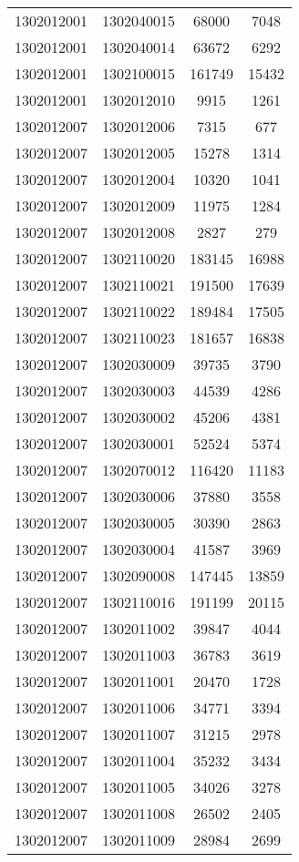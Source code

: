 \begin{longtable}{llcc}
1302012001 & 1302040015 & 68000 & 7048\\
1302012001 & 1302040014 & 63672 & 6292\\
1302012001 & 1302100015 & 161749 & 15432\\
1302012001 & 1302012010 & 9915 & 1261\\
1302012007 & 1302012006 & 7315 & 677\\
1302012007 & 1302012005 & 15278 & 1314\\
1302012007 & 1302012004 & 10320 & 1041\\
1302012007 & 1302012009 & 11975 & 1284\\
1302012007 & 1302012008 & 2827 & 279\\
1302012007 & 1302110020 & 183145 & 16988\\
1302012007 & 1302110021 & 191500 & 17639\\
1302012007 & 1302110022 & 189484 & 17505\\
1302012007 & 1302110023 & 181657 & 16838\\
1302012007 & 1302030009 & 39735 & 3790\\
1302012007 & 1302030003 & 44539 & 4286\\
1302012007 & 1302030002 & 45206 & 4381\\
1302012007 & 1302030001 & 52524 & 5374\\
1302012007 & 1302070012 & 116420 & 11183\\
1302012007 & 1302030006 & 37880 & 3558\\
1302012007 & 1302030005 & 30390 & 2863\\
1302012007 & 1302030004 & 41587 & 3969\\
1302012007 & 1302090008 & 147445 & 13859\\
1302012007 & 1302110016 & 191199 & 20115\\
1302012007 & 1302011002 & 39847 & 4044\\
1302012007 & 1302011003 & 36783 & 3619\\
1302012007 & 1302011001 & 20470 & 1728\\
1302012007 & 1302011006 & 34771 & 3394\\
1302012007 & 1302011007 & 31215 & 2978\\
1302012007 & 1302011004 & 35232 & 3434\\
1302012007 & 1302011005 & 34026 & 3278\\
1302012007 & 1302011008 & 26502 & 2405\\
1302012007 & 1302011009 & 28984 & 2699\\

\end{longtable}
